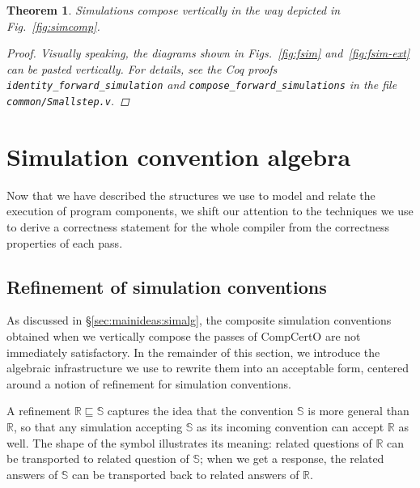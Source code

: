 \documentclass[11pt,oneside,draft]{book}
\newtheorem{theorem}{Theorem}[chapter]
\theoremstyle{definition}
\newcommand{\scref}{\sqsubseteq} %
\begin{document}
\begin{theorem} \label{thm:fsim-vcomp} %
Simulations compose vertically
in the way depicted in Fig.~\ref{fig:simcomp}.
\begin{proof}
Visually speaking,
the diagrams shown in Figs.~\ref{fig:fsim} and~\ref{fig:fsim-ext}
can be pasted vertically.
For details,
see the Coq proofs
\texttt{identity\_forward\_simulation}
and \texttt{compose\_forward\_simulations}
in the file \texttt{common/Smallstep.v}.
\end{proof}
\end{theorem}




\section{Simulation convention algebra} \label{sec:simalg} %

Now that we have described the structures we use
to model and relate the execution of program components,
we shift our attention to the techniques we use
to derive a correctness statement for the whole compiler
from the correctness properties of each pass.

\subsection{Refinement of simulation conventions} \label{sec:scref} %

As discussed in \S\ref{sec:mainideas:simalg},
the composite simulation conventions obtained
when we vertically compose the passes of CompCertO
are not immediately satisfactory.
In the remainder of this section,
we introduce the algebraic infrastructure we use
to rewrite them into an acceptable form,
centered around
a notion of refinement for simulation conventions.

A refinement $\mathbb{R} \scref \mathbb{S}$
captures the idea that the convention $\mathbb{S}$
is more general than $\mathbb{R}$,
so that any simulation accepting $\mathbb{S}$ as its
incoming convention can accept $\mathbb{R}$ as well.
The shape of the symbol illustrates its meaning:
related questions of $\mathbb{R}$ can be transported to
related question of $\mathbb{S}$;
when we get a response, the
related answers of $\mathbb{S}$ can be transported back to
related answers of $\mathbb{R}$.
\end{document}
